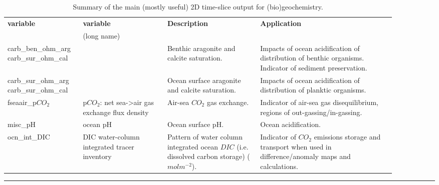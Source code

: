 \begin{table}[ht!]
\begin{tabular}{p{0.15\linewidth} p{0.20\linewidth} p{0.225\linewidth} p{0.325\linewidth}}
\toprule
\textbf{variable} & \textbf{variable} & \textbf{Description} & \textbf{Application}\\
 & (long name) & &\\
\midrule

\textsf{\footnotesize carb\_ben\_ohm\_arg} \textsf{\footnotesize carb\_sur\_ohm\_cal} & \textsf{\footnotesize } & \small{Benthic aragonite and calcite saturation.} & Impacts of ocean acidification of distribution of benthic organisms. Indicator of sediment preservation.\\
\textsf{\footnotesize carb\_sur\_ohm\_arg} \textsf{\footnotesize carb\_sur\_ohm\_cal} & \textsf{\footnotesize } & \small{Ocean surface aragonite and calcite saturation.} & Impacts of ocean acidification of distribution of planktic organisms.\\

\midrule

\textsf{\footnotesize fseaair\_p\(CO_{2}\)} & \textsf{\footnotesize p\(CO_{2}\): net sea->air gas exchange flux density} & \small{Air-sea \(CO_{2}\) gas exchange.} & \small{Indicator of air-sea gas disequilibrium, regions of out-gassing/in-gassing.}\\

\midrule

\textsf{\footnotesize misc\_pH} & \textsf{\footnotesize ocean pH} & \small{Ocean surface pH.} & \small{Ocean acidification.}\\

\midrule

\textsf{\footnotesize ocn\_int\_DIC} & \textsf{\footnotesize DIC water-column integrated tracer inventory} & \small{Pattern of water column integrated ocean \(DIC\) (i.e. dissolved carbon storage) (\(molm^{-2}\)).} & \small{Indicator of \(CO_{2}\) emissions storage and transport when used in difference/anomaly maps and calculations.}\\

\bottomrule
\end{tabular}
\caption{Summary of the main (mostly useful) 2D time-slice output for (bio)geochemistry.}
\end{table}

\vspace{1mm} \noindent\rule{4cm}{0.1mm} \vspace{2mm}


